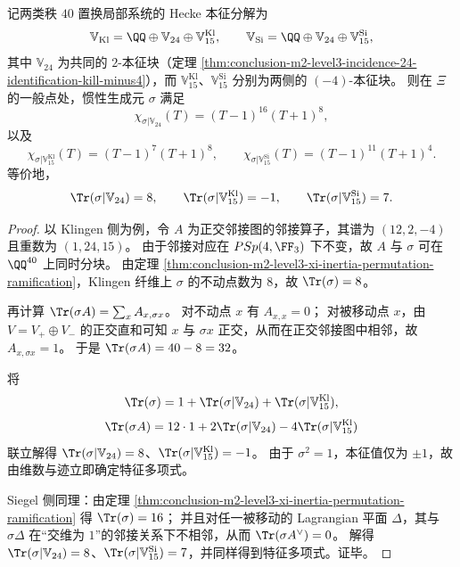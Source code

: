 \begin{theorem}\label{thm:conclusion-m2-level3-xi-inertia-hecke-eigensystems-charpoly}
记两类秩 \(40\) 置换局部系统的 Hecke 本征分解为
\[
\mathbb V_{\mathrm{Kl}}=\QQ\oplus \mathbb V_{24}\oplus \mathbb V_{15}^{\mathrm{Kl}},
\qquad
\mathbb V_{\mathrm{Si}}=\QQ\oplus \mathbb V_{24}\oplus \mathbb V_{15}^{\mathrm{Si}},
\]
其中 \(\mathbb V_{24}\) 为共同的 \(2\)-本征块（定理 \ref{thm:conclusion-m2-level3-incidence-24-identification-kill-minus4}），而 \(\mathbb V_{15}^{\mathrm{Kl}}\)、\(\mathbb V_{15}^{\mathrm{Si}}\) 分别为两侧的 \((-4)\)-本征块。
则在 \(\Xi\) 的一般点处，惯性生成元 \(\sigma\) 满足
\[
\chi_{\sigma|\mathbb V_{24}}(T)=(T-1)^{16}(T+1)^{8},
\]
以及
\[
\chi_{\sigma|\mathbb V_{15}^{\mathrm{Kl}}}(T)=(T-1)^{7}(T+1)^{8},
\qquad
\chi_{\sigma|\mathbb V_{15}^{\mathrm{Si}}}(T)=(T-1)^{11}(T+1)^{4}.
\]
等价地，
\[
\Tr(\sigma|\mathbb V_{24})=8,\qquad
\Tr(\sigma|\mathbb V_{15}^{\mathrm{Kl}})=-1,\qquad
\Tr(\sigma|\mathbb V_{15}^{\mathrm{Si}})=7.
\]
\end{theorem}
\begin{proof}
以 Klingen 侧为例，令 \(A\) 为正交邻接图的邻接算子，其谱为 \((12,2,-4)\) 且重数为 \((1,24,15)\)。
由于邻接对应在 \(PSp(4,\FF_3)\) 下不变，故 \(A\) 与 \(\sigma\) 可在 \(\QQ^{40}\) 上同时分块。
由定理 \ref{thm:conclusion-m2-level3-xi-inertia-permutation-ramification}，Klingen 纤维上 \(\sigma\) 的不动点数为 \(8\)，故 \(\Tr(\sigma)=8\)。
\par
再计算 \(\Tr(\sigma A)=\sum_x A_{x,\sigma x}\)。
对不动点 \(x\) 有 \(A_{x,x}=0\)；
对被移动点 \(x\)，由 \(V=V_+\oplus V_-\) 的正交直和可知 \(x\) 与 \(\sigma x\) 正交，从而在正交邻接图中相邻，故 \(A_{x,\sigma x}=1\)。
于是 \(\Tr(\sigma A)=40-8=32\)。
\par
将
\[
\Tr(\sigma)=1+\Tr(\sigma|\mathbb V_{24})+\Tr(\sigma|\mathbb V_{15}^{\mathrm{Kl}}),
\]
\[
\Tr(\sigma A)=12\cdot 1+2\Tr(\sigma|\mathbb V_{24})-4\Tr(\sigma|\mathbb V_{15}^{\mathrm{Kl}})
\]
联立解得 \(\Tr(\sigma|\mathbb V_{24})=8\)、\(\Tr(\sigma|\mathbb V_{15}^{\mathrm{Kl}})=-1\)。
由于 \(\sigma^2=1\)，本征值仅为 \(\pm1\)，故由维数与迹立即确定特征多项式。
\par
Siegel 侧同理：由定理 \ref{thm:conclusion-m2-level3-xi-inertia-permutation-ramification} 得 \(\Tr(\sigma)=16\)；
并且对任一被移动的 Lagrangian 平面 \(\Delta\)，其与 \(\sigma\Delta\) 在“交维为 \(1\)”的邻接关系下不相邻，从而 \(\Tr(\sigma A^\vee)=0\)。
解得 \(\Tr(\sigma|\mathbb V_{24})=8\)、\(\Tr(\sigma|\mathbb V_{15}^{\mathrm{Si}})=7\)，并同样得到特征多项式。证毕。
\end{proof}

